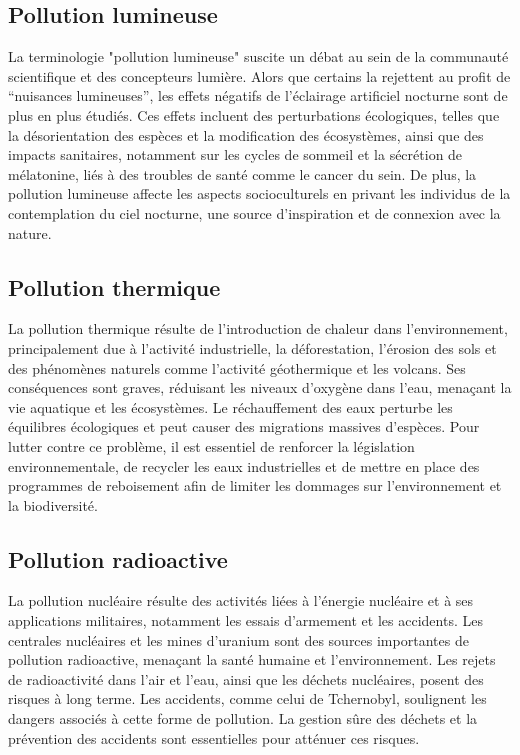 \documentclass{report}
\begin{document}
  \subsection{Pollution lumineuse}
  La terminologie "pollution lumineuse" suscite un débat au sein de la communauté scientifique et des concepteurs lumière. Alors que certains la rejettent au profit de “nuisances lumineuses”, les effets négatifs de l'éclairage artificiel nocturne sont de plus en plus étudiés. Ces effets incluent des perturbations écologiques, telles que la désorientation des espèces et la modification des écosystèmes, ainsi que des impacts sanitaires, notamment sur les cycles de sommeil et la sécrétion de mélatonine, liés à des troubles de santé comme le cancer du sein. 
De plus, la pollution lumineuse affecte les aspects socioculturels en privant les individus de la contemplation du ciel nocturne, une source d'inspiration et de connexion avec la nature.
 \cite{HAL,Mathilde Mauger Vauglin and al.,2023}
   \subsection{Pollution thermique}
  La pollution thermique résulte de l'introduction de chaleur dans l'environnement, principalement due à l'activité industrielle, la déforestation, l'érosion des sols et des phénomènes naturels comme l'activité géothermique et les volcans. 
Ses conséquences sont graves, réduisant les niveaux d'oxygène dans l'eau, menaçant la vie aquatique et les écosystèmes. Le réchauffement des eaux perturbe les équilibres écologiques et peut causer des migrations massives d'espèces. Pour lutter contre ce problème, il est essentiel de renforcer la législation environnementale, de recycler les eaux industrielles et de mettre en place des programmes de reboisement afin de limiter les dommages sur l'environnement et la biodiversité.

 \cite{web 4 : www.narasolar.com}
  \subsection{Pollution radioactive}
   La pollution nucléaire résulte des activités liées à l'énergie nucléaire et à ses applications militaires, notamment les essais d'armement et les accidents. Les centrales nucléaires et les mines d'uranium sont des sources importantes de pollution radioactive, menaçant la santé humaine et l'environnement.
 Les rejets de radioactivité dans l'air et l'eau, ainsi que les déchets nucléaires, posent des risques à long terme. Les accidents, comme celui de Tchernobyl, soulignent les dangers associés à cette forme de pollution. La gestion sûre des déchets et la prévention des accidents sont essentielles pour atténuer ces risques.
 \cite{web 5 : www.narasolar.com} \vspace*{0.5cm}
\end{document}
